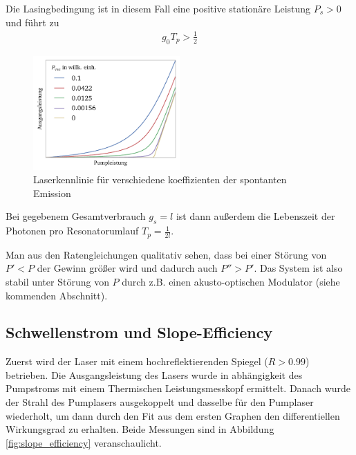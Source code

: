 \documentclass[11pt,twoside=true]{scrartcl}
\begin{document}
Die Lasingbedingung ist in diesem Fall eine positive stationäre Leistung
$P_s > 0$ und führt zu
%
\begin{align*}
  g_0 T_p > \frac{1}{2}
\end{align*}
%
\begin{figure}
  \centering
  \includegraphics[width=0.5\textwidth]{./figures/lasing_pvac.pdf}
  \caption{Laserkennlinie für verschiedene koeffizienten der spontanten
  Emission}
  \label{fig:lasing_pvac}
\end{figure}

Bei gegebenem Gesamtverbrauch $g_s=l$ ist dann außerdem die Lebenszeit der Photonen
pro Resonatorumlauf $T_p = \frac{1}{2 l}$. 

Man aus den Ratengleichungen qualitativ sehen, dass bei einer Störung von $P'<P$
der Gewinn größer wird und dadurch auch $P'' > P'$. Das System ist also stabil unter
Störung von $P$ durch z.B. einen akusto-optischen Modulator (siehe kommenden Abschnitt).

\newpage


\subsection{Schwellenstrom und Slope-Efficiency}
Zuerst wird der Laser mit einem hochreflektierenden Spiegel ($R > 0.99$) betrieben.
Die Ausgangsleistung des Lasers wurde in abhängigkeit des Pumpstroms mit einem 
Thermischen Leistungsmesskopf ermittelt. Danach wurde der Strahl des Pumplasers
ausgekoppelt und dasselbe für den Pumplaser wiederholt, um dann durch den Fit
aus dem ersten Graphen den differentiellen Wirkungsgrad zu erhalten. Beide
Messungen sind in Abbildung \ref{fig:slope_efficiency} veranschaulicht.
\end{document}
